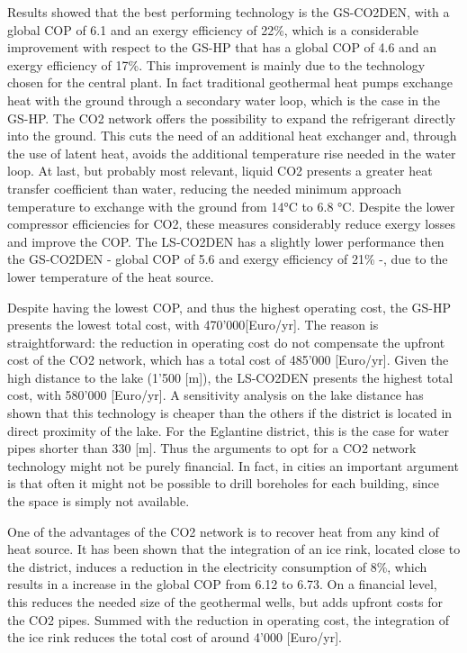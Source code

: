 \documentclass{article}
\begin{document}
Results showed that the best performing technology is the GS-CO2DEN, with a global COP of 6.1 and an exergy efficiency of 22\%, which is a considerable improvement with respect to the GS-HP that has a global COP of 4.6 and an exergy efficiency of 17\%. This improvement is mainly due to the technology chosen for the central plant. In fact traditional geothermal heat pumps exchange heat with the ground through a secondary water loop, which is the case in the GS-HP. The CO2 network offers the possibility to expand the refrigerant directly into the ground. This cuts the need of an additional heat exchanger and, through the use of latent heat, avoids the additional temperature rise needed in the water loop. At last, but probably most relevant, liquid CO2 presents a greater heat transfer coefficient than water, reducing the needed minimum approach temperature to exchange with the ground from 14\si{\celsius} to 6.8 \si{\celsius}. Despite the lower compressor efficiencies for CO2, these measures considerably reduce exergy losses and improve the COP. The LS-CO2DEN has a slightly lower performance then the GS-CO2DEN - global COP of 5.6 and exergy efficiency of 21\% -, due to the lower temperature of the heat source.

Despite having the lowest COP, and thus the highest operating cost, the GS-HP presents the lowest total cost, with 470'000[Euro/yr]. The reason is straightforward: the reduction in operating cost do not compensate the upfront cost of the CO2 network, which has a total cost of 485'000 [Euro/yr]. Given the high distance to the lake (1'500 [m]), the LS-CO2DEN presents the highest total cost, with 580'000 [Euro/yr]. A sensitivity analysis on the lake distance has shown that this technology is cheaper than the others if the district is located in direct proximity of the lake. For the Eglantine district, this is the case for water pipes shorter than 330 [m]. Thus the arguments to opt for a CO2 network technology might not be purely financial. In fact, in cities an important argument is that often it might not be possible to drill boreholes for each building, since the space is simply not available.

One of the advantages of the CO2 network is to recover heat from any kind of heat source. It has been shown that the integration of an ice rink, located close to the district, induces a reduction in the electricity consumption of 8\%, which results in a increase in the global COP from 6.12 to 6.73. On a financial level, this reduces the needed size of the geothermal wells, but adds upfront costs for the CO2 pipes. Summed with the reduction in operating cost, the integration of the ice rink reduces the total cost of around 4'000 [Euro/yr].\\
\end{document}
